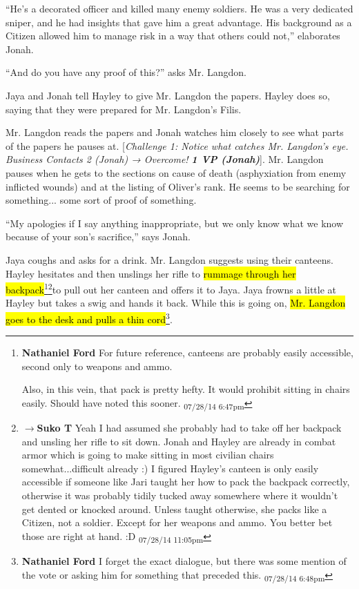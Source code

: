 ``He's a decorated officer and killed many enemy soldiers.  He was a very dedicated sniper, and he had insights that gave him a great advantage. His background as a Citizen allowed him to manage risk in a way that others could not,'' elaborates Jonah.

``And do you have any proof of this?'' asks Mr. Langdon.

Jaya and Jonah tell Hayley to give Mr. Langdon the papers.  Hayley does so, saying that they were prepared for Mr. Langdon's Filis.

Mr. Langdon reads the papers and Jonah watches him closely to see what parts of the papers he pauses at.  {[}\textit{Challenge 1:  Notice what catches Mr. Langdon's eye. Business Contacts 2 (Jonah) → Overcome! }\textit{\textbf{1 VP (Jonah)}}{]}.  Mr. Langdon pauses when he gets to the sections on cause of death (asphyxiation from enemy inflicted wounds) and at the listing of Oliver's rank.  He seems to be searching for something... some sort of proof of something.

``My apologies if I say anything inappropriate, but we only know what we know because of your son's sacrifice,'' says Jonah.

Jaya coughs and asks for a drink.  Mr. Langdon suggests using their canteens.  Hayley hesitates and then unslings her rifle to \hl{rummage through her backpack}\footnote{\textbf{Nathaniel Ford }For future reference, canteens are probably easily accessible, second only to weapons and ammo.

Also, in this vein, that pack is pretty hefty. It would prohibit sitting in chairs easily. Should have noted this sooner. \textsubscript{07/28/14 6:47pm}}\footnote{$\rightarrow$\textbf{Suko T }Yeah I had assumed she probably had to take off her backpack and unsling her rifle to sit down.  Jonah and Hayley are already in combat armor which is going to make sitting in most civilian chairs somewhat...difficult already :)  I figured Hayley's canteen is only easily accessible if someone like Jari taught her how to pack the backpack correctly, otherwise it was probably tidily tucked away somewhere where it wouldn't get dented or knocked around.  Unless taught otherwise, she packs like a Citizen, not a soldier.  Except for her weapons and ammo.  You better bet those are right at hand. :D \textsubscript{07/28/14 11:05pm}}to pull out her canteen and offers it to Jaya.  Jaya frowns a little at Hayley but takes a swig and hands it back.  While this is going on, \hl{Mr. Langdon goes to the desk and pulls a thin cord}\footnote{\textbf{Nathaniel Ford }I forget the exact dialogue, but there was some mention of the vote or asking him for something that preceded this. \textsubscript{07/28/14 6:48pm}}.

